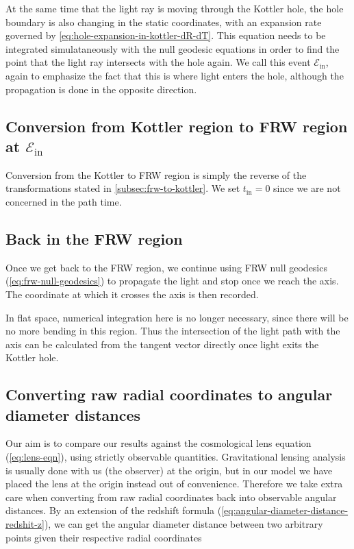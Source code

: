 At the same time that the light ray is moving through the Kottler hole, the hole boundary is also changing in the static coordinates, with an expansion rate governed by \autoref{eq:hole-expansion-in-kottler-dR-dT}. This equation needs to be integrated simulataneously with the null geodesic equations in order to find the point that the light ray intersects with the hole again. We call this event $\mathcal{E}_{\text{in}}$, again to emphasize the fact that this is where light enters the hole, although the propagation is done in the opposite direction. 

\subsection{Conversion from Kottler region to FRW region at $\mathcal{E}_{\text{in}}$}

Conversion from the Kottler to FRW region is simply the reverse of the transformations stated in \autoref{subsec:frw-to-kottler}. We set $t_{\text{in}} = 0$ since we are not concerned in the path time. 

\subsection{Back in the FRW region}

Once we get back to the FRW region, we continue using FRW null geodesics (\autoref{eq:frw-null-geodesics}) to propagate the light and stop once we reach the axis. The coordinate at which it crosses the axis is then recorded. 

In flat space, numerical integration here is no longer necessary, since there will be no more bending in this region. Thus the intersection of the light path with the axis can be calculated from the tangent vector directly once light exits the Kottler hole. 

\subsection{Converting raw radial coordinates to angular diameter distances}

Our aim is to compare our results against the cosmological lens equation (\autoref{eq:lens-eqn}), using strictly observable quantities. Gravitational lensing analysis is usually done with us (the observer) at the origin, but in our model we have placed the lens at the origin instead out of convenience. Therefore we take extra care when converting from raw radial coordinates back into observable angular distances. By an extension of the redshift formula (\autoref{eq:angular-diameter-distance-redshit-z}), we can get the angular diameter distance between two arbitrary points given their respective radial coordinates \citep{peacock1999cosmological}

